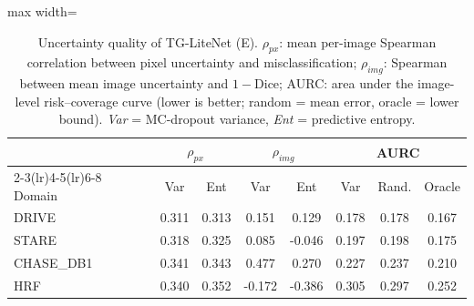 \begin{table}[t]
\centering
\caption{Uncertainty quality of TG-LiteNet (E). $\rho_{px}$: mean per-image Spearman correlation between pixel uncertainty and misclassification; $\rho_{img}$: Spearman between mean image uncertainty and $1-$Dice; AURC: area under the image-level risk--coverage curve (lower is better; random = mean error, oracle = lower bound). \emph{Var} = MC-dropout variance, \emph{Ent} = predictive entropy.}
\label{tab:unc}
\small
\begin{adjustbox}{max width=\columnwidth}\begin{tabular}{l cc cc ccc}
\toprule
 & \multicolumn{2}{c}{$\rho_{px}$} & \multicolumn{2}{c}{$\rho_{img}$} & \multicolumn{3}{c}{AURC} \\
\cmidrule(lr){2-3}\cmidrule(lr){4-5}\cmidrule(lr){6-8}
Domain & Var & Ent & Var & Ent & Var & Rand. & Oracle \\
\midrule
DRIVE & 0.311 & 0.313 & 0.151 & 0.129 & 0.178 & 0.178 & 0.167 \\
STARE & 0.318 & 0.325 & 0.085 & -0.046 & 0.197 & 0.198 & 0.175 \\
CHASE\_DB1 & 0.341 & 0.343 & 0.477 & 0.270 & 0.227 & 0.237 & 0.210 \\
HRF & 0.340 & 0.352 & -0.172 & -0.386 & 0.305 & 0.297 & 0.252 \\
\bottomrule
\end{tabular}\end{adjustbox}
\end{table}
